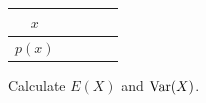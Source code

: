 \begin{center}
\begin{tabular}{|c||c|c|c|c|}
\hline
$x$ &  \hspace{0.5in}  &  \hspace{0.5in}  &  \hspace{0.5in}  &  \hspace{0.5in} \\
\hline
$p(x)$ & & & &  \\
\hline
\end{tabular}
\end{center} \medskip

\ii Calculate $E(X)$ and $\mbox{Var}(X)$.
\ee
\ee
\vfill
